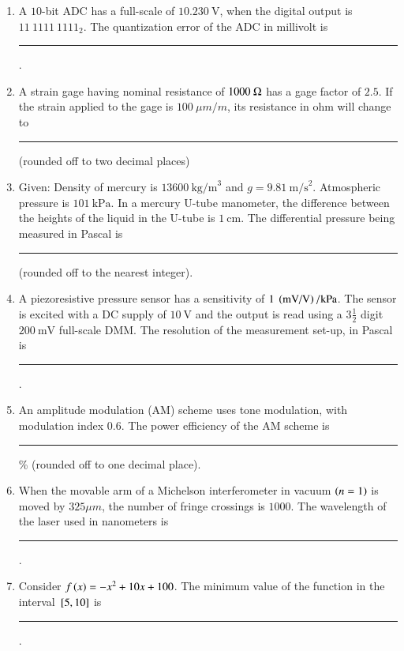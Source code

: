 \documentclass[journal,12pt,onecolumn]{IEEEtran}
\theoremstyle{remark}
\begin{document}
\begin{enumerate}
\item A $10$-bit ADC has a full-scale of $10.230\ \text{V}$, when the digital output is $11\ 1111\ 1111_2$. 
The quantization error of the ADC in millivolt is \rule{1.5cm}{0.4pt}. \par \hfill{}

\item A strain gage having nominal resistance of $1000\ \ohm$ has a gage factor of $2.5$. 
If the strain applied to the gage is $100\ \mu m/m$, its resistance in ohm will change to 
\rule{1.5cm}{0.4pt} (rounded off to two decimal places) \par \hfill{}

\item Given: Density of mercury is $13600\ \text{kg/m}^3$ and $g=9.81\ \text{m/s}^2$. 
Atmospheric pressure is $101\ \text{kPa}$. In a mercury U-tube manometer, the difference between the heights of the liquid in the U-tube is $1\ \text{cm}$. 
The differential pressure being measured in Pascal is \rule{1.5cm}{0.4pt} (rounded off to the nearest integer). \par \hfill{}

\item A piezoresistive pressure sensor has a sensitivity of $1\ \left(\text{mV/V}\right)/\text{kPa}$. 
The sensor is excited with a DC supply of $10\ \text{V}$ and the output is read using a $3\frac{1}{2}$ digit $200\ \text{mV}$ full-scale DMM. 
The resolution of the measurement set-up, in Pascal is \rule{1.5cm}{0.4pt}. \par \hfill{}

\item An amplitude modulation (AM) scheme uses tone modulation, with modulation index $0.6$. 
The power efficiency of the AM scheme is \rule{1.5cm}{0.4pt} \% (rounded off to one decimal place). \par \hfill{}

\item When the movable arm of a Michelson interferometer in vacuum $\left(n=1\right)$ is moved by $325\mu m$, the number of fringe crossings is $1000$. The wavelength of the laser used in nanometers is \rule{1.5cm}{0.4pt}. \par \hfill{}

\item Consider $f\left(x\right) = -x^2 + 10x + 100$. The minimum value of the function in the interval ${}\left[5, 10\right]$ is \rule{1.5cm}{0.4pt}. \par \hfill{}


\end{enumerate}
\end{document}
